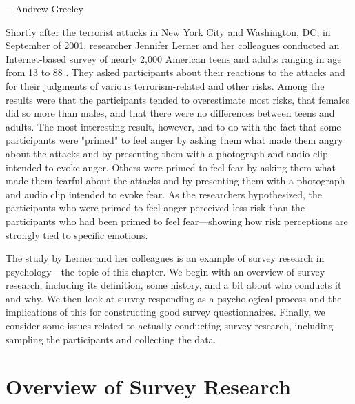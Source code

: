  {---Andrew Greeley}

Shortly after the terrorist attacks in New York City and Washington, DC, in September of 2001, researcher Jennifer Lerner and her colleagues conducted an Internet-based survey of nearly 2,000 American teens and adults ranging in age from 13 to 88 \citep{lerner_effects_2003}. They asked participants about their reactions to the attacks and for their judgments of various terrorism-related and other risks. Among the results were that the participants tended to overestimate most risks, that females did so more than males, and that there were no differences between teens and adults. The most interesting result, however, had to do with the fact that some participants were "primed" to feel anger by asking them what made them angry about the attacks and by presenting them with a photograph and audio clip intended to evoke anger. Others were primed to feel fear by asking them what made them fearful about the attacks and by presenting them with a photograph and audio clip intended to evoke fear. As the researchers hypothesized, the participants who were primed to feel anger perceived less risk than the participants who had been primed to feel fear---showing how risk perceptions are strongly tied to specific emotions.

The study by Lerner and her colleagues is an example of survey research in psychology---the topic of this chapter. We begin with an overview of survey research, including its definition, some history, and a bit about who conducts it and why. We then look at survey responding as a psychological process and the implications of this for constructing good survey questionnaires. Finally, we consider some issues related to actually conducting survey research, including sampling the participants and collecting the data.

\section{Overview of Survey Research}


